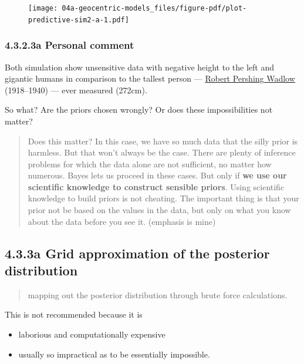 \documentclass[
  letterpaper,
  DIV=11,
  numbers=noendperiod]{scrreprt}
\providecommand{\tightlist}{%
  \setlength{\itemsep}{0pt}\setlength{\parskip}{0pt}}\usepackage{longtable,booktabs,array}
\begin{document}
\begin{figure}[H]

{\centering \texttt{[image: 04a-geocentric-models\_files/figure-pdf/plot-predictive-sim2-a-1.pdf]}

}

\end{figure}

\hypertarget{a-personal-comment}{%
\subsubsection{4.3.2.3a Personal comment}\label{a-personal-comment}}

Both simulation show unsensitive data with negative height to the left
and gigantic humans in comparison to the tallest person ---
\href{https://en.wikipedia.org/wiki/Robert_Wadlow}{Robert Pershing
Wadlow} (1918--1940) --- ever measured (272cm).

So what? Are the priors chosen wrongly? Or does these impossibilities
not matter?

\begin{quote}
Does this matter? In this case, we have so much data that the silly
prior is harmless. But that won't always be the case. There are plenty
of inference problems for which the data alone are not sufficient, no
matter how numerous. Bayes lets us proceed in these cases. But only if
\textbf{we use our scientific knowledge to construct sensible priors}.
Using scientific knowledge to build priors is not cheating. The
important thing is that your prior not be based on the values in the
data, but only on what you know about the data before you see it.
(emphasis is mine)
\end{quote}

\hypertarget{a-grid-approximation-of-the-posterior-distribution}{%
\subsection{4.3.3a Grid approximation of the posterior
distribution}\label{a-grid-approximation-of-the-posterior-distribution}}

\begin{quote}
mapping out the posterior distribution through brute force calculations.
\end{quote}

This is not recommended because it is

\begin{itemize}
\tightlist
\item
  laborious and computationally expensive
\item
  usually so impractical as to be essentially impossible.
\end{itemize}
\end{document}
